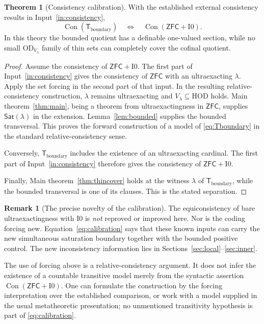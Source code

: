 \documentclass[11pt,letterpaper]{article}
\theoremstyle{definition}
\newtheorem{theorem}[definition]{Theorem}
\newtheorem{remark}[definition]{Remark}
\numberwithin{equation}{section}
\newcommand{\ZFC}{\mathsf{ZFC}}
\newcommand{\HOD}{\mathrm{HOD}}
\newcommand{\OD}{\mathrm{OD}}
\newcommand{\Con}{\operatorname{Con}}
\newcommand{\Izero}{\mathrm{I0}}
\newcommand{\Sat}{\mathsf{Sat}}
\newcommand{\Tboundary}{\mathsf T_{\mathrm{boundary}}}
\begin{document}
\begin{theorem}[Consistency calibration]\label{thm:calibration}
With the established external consistency results in Input~\ref{in:consistency},
\begin{equation}\label{eq:calibration}
             \Con(\Tboundary)
                    \quad\Longleftrightarrow\quad
             \Con(\ZFC+\Izero).
\end{equation}
In this theory the bounded quotient has a definable one-valued section, while no small $\OD_{V_\lambda}$ family of thin sets can completely cover the cofinal quotient.
\end{theorem}

\begin{proof}
Assume the consistency of $\ZFC+\Izero$. The first part of Input~\ref{in:consistency} gives the consistency of $\ZFC$ with an ultraexacting $\lambda$. Apply the set forcing in the second part of that input. In the resulting relative-consistency construction, $\lambda$ remains ultraexacting and $V_\lambda\subseteq\HOD$ holds. Main theorem~\ref{thm:main}, being a theorem from ultraexactingness in $\ZFC$, supplies $\Sat(\lambda)$ in the extension. Lemma~\ref{lem:bounded} supplies the bounded transversal. This proves the forward construction of a model of \eqref{eq:Tboundary} in the standard relative-consistency sense.

Conversely, $\Tboundary$ includes the existence of an ultraexacting cardinal. The first part of Input~\ref{in:consistency} therefore gives the consistency of $\ZFC+\Izero$.

Finally, Main theorem~\ref{thm:thincover} holds at the witness $\lambda$ of $\Tboundary$, while the bounded transversal is one of its clauses. This is the stated separation.
\end{proof}

\begin{remark}[The precise novelty of the calibration]
The equiconsistency of bare ultraexactingness with $\Izero$ is \emph{not} reproved or improved here. Nor is the coding forcing new. Equation~\eqref{eq:calibration} says that these known inputs can carry the new simultaneous saturation boundary together with the bounded positive control. The new inconsistency information lies in Sections~\ref{sec:local}--\ref{sec:inner}.
\end{remark}

The use of forcing above is a relative-consistency argument. It does not infer the existence of a countable transitive model merely from the syntactic assertion $\Con(\ZFC+\Izero)$. One can formulate the construction by the forcing interpretation over the established comparison, or work with a model supplied in the usual metatheoretic presentation; no unmentioned transitivity hypothesis is part of \eqref{eq:calibration}.
\end{document}
